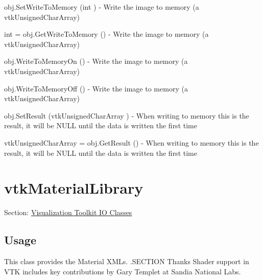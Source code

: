 \begin{DoxyItemize}
\item {\ttfamily obj.\-Set\-Write\-To\-Memory (int )} -\/ Write the image to memory (a vtk\-Unsigned\-Char\-Array)  
\item {\ttfamily int = obj.\-Get\-Write\-To\-Memory ()} -\/ Write the image to memory (a vtk\-Unsigned\-Char\-Array)  
\item {\ttfamily obj.\-Write\-To\-Memory\-On ()} -\/ Write the image to memory (a vtk\-Unsigned\-Char\-Array)  
\item {\ttfamily obj.\-Write\-To\-Memory\-Off ()} -\/ Write the image to memory (a vtk\-Unsigned\-Char\-Array)  
\item {\ttfamily obj.\-Set\-Result (vtk\-Unsigned\-Char\-Array )} -\/ When writing to memory this is the result, it will be N\-U\-L\-L until the data is written the first time  
\item {\ttfamily vtk\-Unsigned\-Char\-Array = obj.\-Get\-Result ()} -\/ When writing to memory this is the result, it will be N\-U\-L\-L until the data is written the first time  
\end{DoxyItemize}\hypertarget{vtkio_vtkmateriallibrary}{}\section{vtk\-Material\-Library}\label{vtkio_vtkmateriallibrary}
Section\-: \hyperlink{sec_vtkio}{Visualization Toolkit I\-O Classes} \hypertarget{vtkwidgets_vtkxyplotwidget_Usage}{}\subsection{Usage}\label{vtkwidgets_vtkxyplotwidget_Usage}
This class provides the Material X\-M\-Ls. .S\-E\-C\-T\-I\-O\-N Thanks Shader support in V\-T\-K includes key contributions by Gary Templet at Sandia National Labs.

